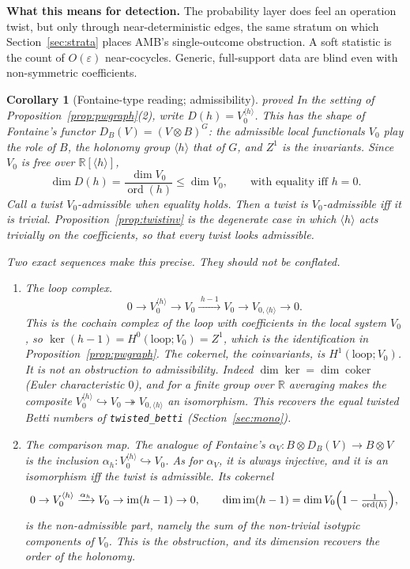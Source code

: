 \documentclass[11pt]{article}
\newtheorem{corollary}[theorem]{Corollary}
\theoremstyle{definition}
\theoremstyle{remark}
\newcommand{\R}{\mathbb{R}}
\newcommand{\st}[1]{\textsf{\small\color{gray}#1}}
\begin{document}
\textbf{What this means for detection.} The probability layer does feel an operation twist, but only through near-deterministic edges, the same stratum on which Section~\ref{sec:strata} places AMB's single-outcome obstruction. A soft statistic is the count of $O(\varepsilon)$ near-cocycles. Generic, full-support data are blind even with non-symmetric coefficients.

\begin{corollary}[Fontaine-type reading; admissibility]\label{cor:admiss}\st{proved}
In the setting of Proposition~\ref{prop:pwgraph}(2), write $D(h)=V_0^{\langle h\rangle}$. This has the shape of Fontaine's functor $D_B(V)=(V\otimes B)^G$: the admissible local functionals $V_0$ play the role of $B$, the holonomy group $\langle h\rangle$ that of $G$, and $Z^1$ is the invariants. Since $V_0$ is free over $\R[\langle h\rangle]$,
\[
\dim D(h)=\frac{\dim V_0}{\operatorname{ord}(h)}\le\dim V_0,
\qquad\text{with equality iff }h=0.
\]
Call a twist \emph{$V_0$-admissible} when equality holds. Then a twist is $V_0$-admissible iff it is trivial. Proposition~\ref{prop:twistinv} is the degenerate case in which $\langle h\rangle$ acts trivially on the coefficients, so that every twist looks admissible.

Two exact sequences make this precise. They should not be conflated.
\begin{enumerate}
  \item \emph{The loop complex.}
  \[
  0\to V_0^{\langle h\rangle}\to V_0\xrightarrow{\;h-1\;}V_0\to V_{0,\langle h\rangle}\to0 .
  \]
  This is the cochain complex of the loop with coefficients in the local system $V_0$, so $\ker(h-1)=H^0(\text{loop};V_0)=Z^1$, which is the identification in Proposition~\ref{prop:pwgraph}. The cokernel, the coinvariants, is $H^1(\text{loop};V_0)$. It is \emph{not} an obstruction to admissibility. Indeed $\dim\ker=\dim\operatorname{coker}$ (Euler characteristic $0$), and for a finite group over $\R$ averaging makes the composite $V_0^{\langle h\rangle}\hookrightarrow V_0\twoheadrightarrow V_{0,\langle h\rangle}$ an isomorphism. This recovers the equal twisted Betti numbers of \texttt{twisted\_betti} (Section~\ref{sec:mono}).
  \item \emph{The comparison map.} The analogue of Fontaine's $\alpha_V\colon B\otimes D_B(V)\to B\otimes V$ is the inclusion $\alpha_h\colon V_0^{\langle h\rangle}\hookrightarrow V_0$. As for $\alpha_V$, it is always injective, and it is an isomorphism iff the twist is admissible. Its cokernel
  \[
  0\to V_0^{\langle h\rangle}\xrightarrow{\alpha_h}V_0\to\operatorname{im}(h-1)\to0,\qquad \dim\operatorname{im}(h-1)=\dim V_0\Bigl(1-\tfrac1{\operatorname{ord}(h)}\Bigr),
  \]
  is the non-admissible part, namely the sum of the non-trivial isotypic components of $V_0$. This is the obstruction, and its dimension recovers the order of the holonomy.
\end{enumerate}
\end{corollary}
\end{document}
